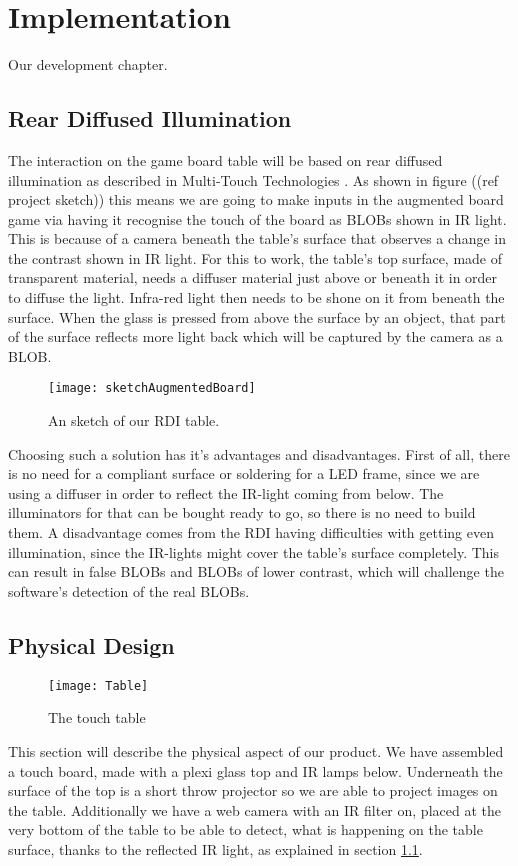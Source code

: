 \chapter{Implementation}\label{ch:implementation}
Our development chapter. 

\section{Rear Diffused Illumination} \label{sec:RDI}
The interaction on the game board table will be based on rear diffused illumination as described in Multi-Touch Technologies \citep{multiTT}. As shown in figure ((ref project sketch)) this means we are going to make inputs in the augmented board game via having it recognise the touch of the board as BLOBs shown in IR light. This is because of a camera beneath the table's surface that observes a change in the contrast shown in IR light. 
For this to work, the table's top surface, made of transparent material, needs a diffuser material just above or beneath it in order to diffuse the light. Infra-red light then needs to be shone on it from beneath the surface. When the glass is pressed from above the surface by an object, that part of the surface reflects more light back which will be captured by the camera as a BLOB.
\begin{figure}[!h]
\centering	\texttt{[image: sketchAugmentedBoard]}
\label{Fig:sketch} \caption{An sketch of our RDI table.}
\end{figure}

Choosing such a solution has it's advantages and disadvantages. First of all, there is no need for a compliant surface or soldering for a LED frame, since we are using a diffuser in order to reflect the IR-light coming from below. The illuminators for that can be bought ready to go, so there is no need to build them. A disadvantage comes from the RDI having difficulties with getting even illumination, since the IR-lights might cover the table's surface completely. This can result in false BLOBs and BLOBs of lower contrast, which will challenge the software's detection of the real BLOBs.

\section{Physical Design} 
\begin{figure} [!h]
\centering \texttt{[image: Table]}
\label{Fig:Table} \caption{The touch table}
\end{figure}
This section will describe the physical aspect of our product.
We have assembled a touch board, made with a plexi glass top and IR lamps below. Underneath the surface of the top is a short throw projector so we are able to project images on the table. Additionally we have a web camera with an IR filter on, placed at the very bottom of the table to be able to detect, what is happening on the table surface, thanks to the reflected IR light, as explained in section \ref{sec:RDI}.

